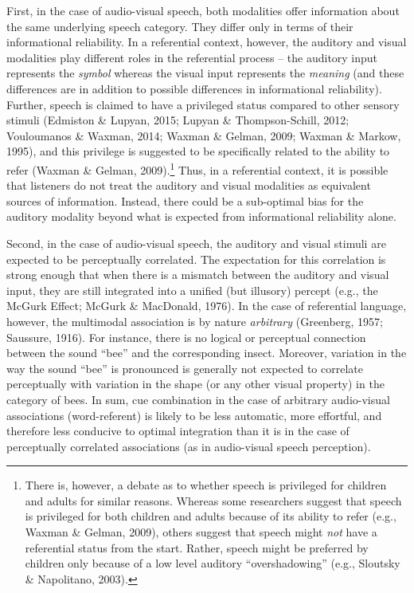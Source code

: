 \documentclass[english,,man,floatsintext]{apa6}
\let\rmarkdownfootnote\footnote%
\def\footnote{\protect\rmarkdownfootnote}
\theoremstyle{definition}
\theoremstyle{definition}
\theoremstyle{definition}
\theoremstyle{remark}
\begin{document}
First, in the case of audio-visual speech, both modalities offer
information about the same underlying speech category. They differ only
in terms of their informational reliability. In a referential context,
however, the auditory and visual modalities play different roles in the
referential process -- the auditory input represents the \emph{symbol}
whereas the visual input represents the \emph{meaning} (and these
differences are in addition to possible differences in informational
reliability). Further, speech is claimed to have a privileged status
compared to other sensory stimuli (Edmiston \& Lupyan, 2015; Lupyan \&
Thompson-Schill, 2012; Vouloumanos \& Waxman, 2014; Waxman \& Gelman,
2009; Waxman \& Markow, 1995), and this privilege is suggested to be
specifically related to the ability to refer (Waxman \& Gelman,
2009).\footnote{There is, however, a debate as to whether speech is
  privileged for children and adults for similar reasons. Whereas some
  researchers suggest that speech is privileged for both children and
  adults because of its ability to refer (e.g., Waxman \& Gelman, 2009),
  others suggest that speech might \emph{not} have a referential status
  from the start. Rather, speech might be preferred by children only
  because of a low level auditory ``overshadowing'' (e.g., Sloutsky \&
  Napolitano, 2003).} Thus, in a referential context, it is possible
that listeners do not treat the auditory and visual modalities as
equivalent sources of information. Instead, there could be a sub-optimal
bias for the auditory modality beyond what is expected from
informational reliability alone.

Second, in the case of audio-visual speech, the auditory and visual
stimuli are expected to be perceptually correlated. The expectation for
this correlation is strong enough that when there is a mismatch between
the auditory and visual input, they are still integrated into a unified
(but illusory) percept (e.g., the McGurk Effect; McGurk \& MacDonald,
1976). In the case of referential language, however, the multimodal
association is by nature \emph{arbitrary} (Greenberg, 1957; Saussure,
1916). For instance, there is no logical or perceptual connection
between the sound \enquote{bee} and the corresponding insect. Moreover,
variation in the way the sound \enquote{bee} is pronounced is generally
not expected to correlate perceptually with variation in the shape (or
any other visual property) in the category of bees. In sum, cue
combination in the case of arbitrary audio-visual associations
(word-referent) is likely to be less automatic, more effortful, and
therefore less conducive to optimal integration than it is in the case
of perceptually correlated associations (as in audio-visual speech
perception).
\end{document}
